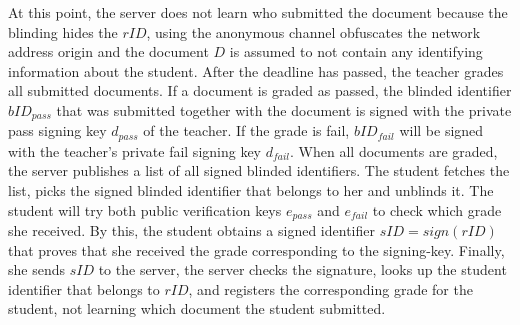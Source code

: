At this point, the server does not learn who submitted the document
because the blinding hides the $rID$, using the anonymous channel
obfuscates the network address origin and the document $D$ is assumed
to not contain any identifying information about the student.
After the deadline has passed, the teacher grades all submitted documents.
If a document is graded as passed, the
blinded identifier $bID_{pass}$ that was submitted together with the document
is signed with the private pass signing key $d_{pass}$ of the teacher. If the grade is fail, $bID_{fail}$
will be signed with the teacher's private fail signing key $d_{fail}$.
When all documents are graded, the server publishes a list of all signed
blinded identifiers. 
The student fetches the list, picks the signed blinded identifier that
belongs to her and unblinds it. 
The student will try both public verification keys $e_{pass}$ and $e_{fail}$
to check which grade she received. 
By this, the student obtains a signed identifier $sID = sign(rID)$
that proves that she received the grade corresponding to
the signing-key.
Finally, she sends $sID$ to the server, the server checks the signature,
looks up the student identifier that belongs to $rID$, and registers the
corresponding grade for the student, not learning which document the
student submitted.

